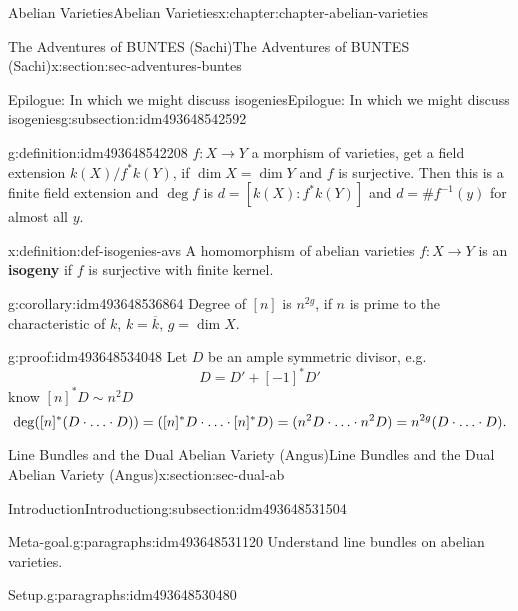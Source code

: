 \documentclass[oneside,10pt,]{book}
\newcommand{\terminology}[1]{\textbf{#1}}
\newcommand{\qedhere}{\relax}
\numberwithin{equation}{section}
\newcommand{\lb}{[}
\newcommand{\rb}{]}
\begin{document}
\begin{chapterptx}{Abelian Varieties}{}{Abelian Varieties}{}{}{x:chapter:chapter-abelian-varieties}
\begin{sectionptx}{The Adventures of BUNTES (Sachi)}{}{The Adventures of BUNTES (Sachi)}{}{}{x:section:sec-adventures-buntes}
\begin{subsectionptx}{Epilogue: In which we might discuss isogenies}{}{Epilogue: In which we might discuss isogenies}{}{}{g:subsection:idm493648542592}
\begin{definition}{}{g:definition:idm493648542208}%
\(f\colon X \to Y\) a morphism of varieties, get a field extension \(k(X)/f^*k(Y)\), if \(\dim X = \dim Y\) and \(f\) is surjective. Then this is a finite field extension and \(\deg f\) is \(d = \lb k(X) : f^*k(Y)\rb\) and \(d = \#f^{-1}(y)\) for almost all \(y\).%
\end{definition}
\begin{definition}{}{x:definition:def-isogenies-avs}%
A homomorphism of abelian varieties \(f\colon X \to Y\) is an \terminology{isogeny} if \(f\) is surjective with finite kernel.%
\end{definition}
\begin{corollary}{}{}{g:corollary:idm493648536864}%
Degree of \(\lb n\rb\) is \(n^{2g}\), if \(n\) is prime to the characteristic of \(k\), \(k = \overline k\), \(g = \dim X\).%
\end{corollary}
\begin{proofptx}{}{g:proof:idm493648534048}
Let \(D\) be an ample symmetric divisor, e.g.%
\begin{equation*}
D = D' + [-1]^* D'
\end{equation*}
know \(\lb n \rb^* D \sim n^2 D\)%
\begin{equation*}
\deg([n]^*(D\cdot\ldots\cdot D)) = ([n]^*D\cdot \ldots\cdot [n]^*D) = (n^2 D\cdot\ldots\cdot n^2 D)= n^{2g} (D\cdot \ldots\cdot D)\text{.}\qedhere
\end{equation*}
%
\end{proofptx}
\end{subsectionptx}
\end{sectionptx}
%
%
\typeout{************************************************}
\typeout{************************************************}
%
\begin{sectionptx}{Line Bundles and the Dual Abelian Variety (Angus)}{}{Line Bundles and the Dual Abelian Variety (Angus)}{}{}{x:section:sec-dual-ab}
%
%
\typeout{************************************************}
\typeout{************************************************}
%
\begin{subsectionptx}{Introduction}{}{Introduction}{}{}{g:subsection:idm493648531504}
\begin{paragraphs}{Meta-goal.}{g:paragraphs:idm493648531120}%
Understand line bundles on abelian varieties.%
\end{paragraphs}%
\begin{paragraphs}{Setup.}{g:paragraphs:idm493648530480}%

\end{paragraphs}
\end{subsectionptx}
\end{sectionptx}
\end{chapterptx}
\end{document}
